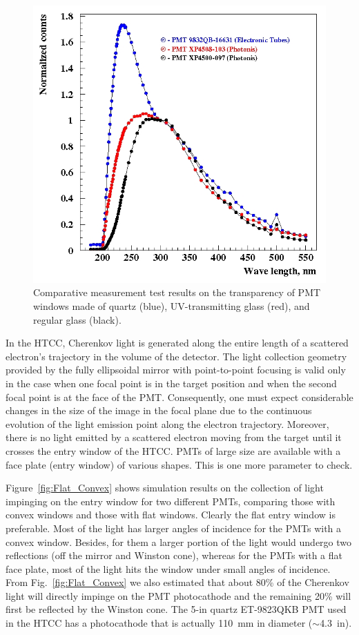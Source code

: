 \begin{figure}[!ht]
    \centering
    \includegraphics[width=1.0\linewidth,trim={1.7cm 0.5cm 0.05cm 0.1cm},clip]{images/Quartz_UV_glass.jpg}
    \caption{Comparative measurement test results on the transparency of PMT windows made of quartz (blue),
      UV-transmitting glass (red), and regular glass (black).}
    \label{fig:Quartz_UV_glass}
\end{figure}

In the HTCC, Cherenkov light is generated along the entire length of a scattered electron's trajectory in the volume
of the detector. The light collection geometry provided by the fully ellipsoidal mirror with point-to-point focusing is
valid only in the case when one focal point is in the target position and when the second focal point is at the face of
the PMT. Consequently, one must expect considerable changes in the size of the image in the focal plane due to the
continuous evolution of the light emission point along the electron trajectory. Moreover, there is no light emitted by
a scattered electron moving from the target until it crosses the entry window of the HTCC. PMTs of large size are
available with a face plate (entry window) of various shapes. This is one more parameter to check.

Figure~\ref{fig:Flat_Convex} shows simulation results on the collection of light impinging on the entry window for two
different PMTs, comparing those with convex windows and those with flat windows. Clearly the flat entry window is
preferable. Most of the light has larger angles of incidence for the PMTs with a convex window. Besides,
for them a larger portion of the light would undergo two reflections (off the mirror and Winston cone), whereas for
the PMTs with a flat face plate, most of the light hits the window under small angles of incidence. From
Fig.~\ref{fig:Flat_Convex} we also estimated that about 80\% of the Cherenkov light will directly impinge on the
PMT photocathode and the remaining 20\% will first be reflected by the Winston cone. The 5-in quartz ET-9823QKB
PMT used in the HTCC has a photocathode that is actually 110~mm in diameter ($\sim$4.3~in). 

